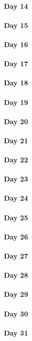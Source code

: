 \documentclass[UTF8,a4paper,8pt]{ctexart}
\begin{document}
 	 \paragraph{Day 14      \quad     }
 	 \paragraph{Day 15      \quad     }
 	 \paragraph{Day 16      \quad     }
 	 \paragraph{Day 17      \quad     }
 	 \paragraph{Day 18      \quad     }
 	 \paragraph{Day 19      \quad     }
 	 \paragraph{Day 20      \quad     }
 	 \paragraph{Day 21      \quad     }
 	 \paragraph{Day 22      \quad     }
 	 \paragraph{Day 23      \quad     }
 	 \paragraph{Day 24      \quad     }
 	 \paragraph{Day 25      \quad     }
 	 \paragraph{Day 26      \quad     }
 	 \paragraph{Day 27      \quad     }
 	 \paragraph{Day 28      \quad     }
 	 \paragraph{Day 29      \quad     }   
 	 \paragraph{Day 30      \quad     }
 	 \paragraph{Day 31      \quad     }
	
	
\end{document}
